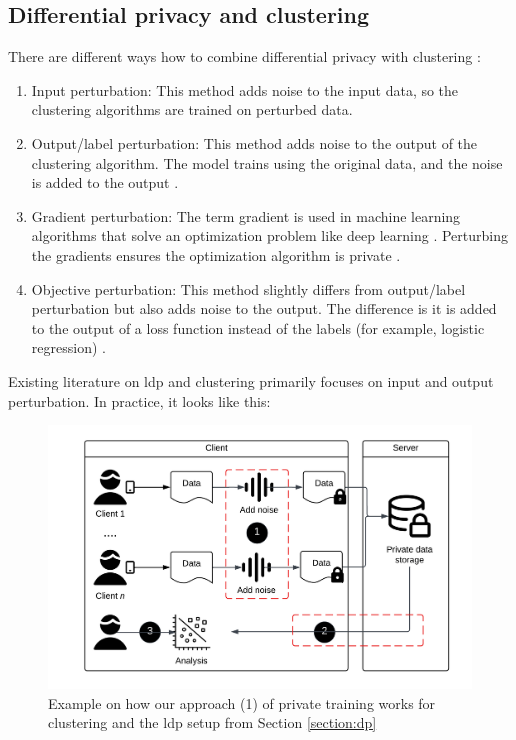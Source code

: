 \subsection{Differential privacy and clustering} \label{theory:literature-review:dp-clustering}
There are different ways how to combine differential privacy with clustering \citep{baraheem_survey_2022}:
\begin{enumerate}
  \item Input perturbation: This method adds noise to the input data, so the clustering algorithms are trained on perturbed data.
  \item Output/label perturbation: This method adds noise to the output of the clustering algorithm.
        The model trains using the original data, and the noise is added to the output \citep{ji_differential_2014}.
        \item Gradient perturbation: The term gradient is used in machine learning algorithms that solve an optimization problem like deep learning \citep{hassan_differential_2019}.
        Perturbing the gradients ensures the optimization algorithm is private \citep{ji_differential_2014}.
  \item Objective perturbation: This method slightly differs from output/label perturbation but also adds noise to the output.
        The difference is it is added to the output of a loss function instead of the labels (for example, logistic regression) \citep{baraheem_survey_2022}.
\end{enumerate}
Existing literature on \gls{ldp} and clustering primarily focuses on input and output perturbation. 
In practice, it looks like this:
\begin{figure}[H]
  \includegraphics[width=0.75\linewidth]{TheorethicalFramework//ND-Laplace//Images/Thesis-nd - Page 7.png}
 \caption{Example on how our approach (1) of private training works for clustering and the \gls{ldp} setup from Section \ref{section:dp}}
  \label{fig:overview-clustering-and-dp}
\end{figure}
